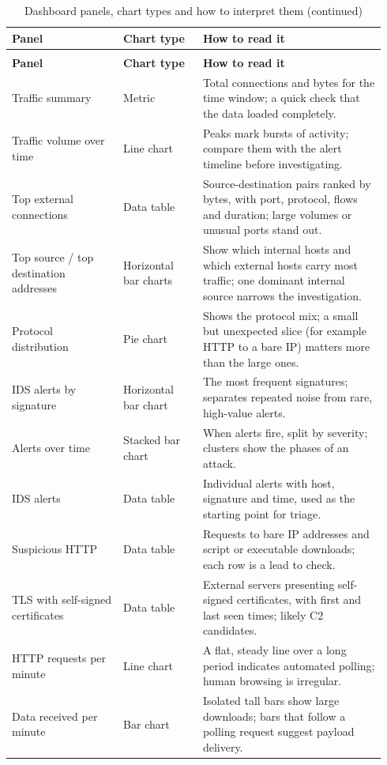 \begin{longtable}{@{}>{\colragged\arraybackslash}p{0.28\linewidth}>{\colragged\arraybackslash}p{0.20\linewidth}>{\colragged\arraybackslash}p{0.46\linewidth}@{}}
  \caption{Dashboard panels, chart types and how to interpret them.}
  \label{tab:dashboard-panels} \\
  \toprule
  \textbf{Panel} & \textbf{Chart type} & \textbf{How to read it} \\
  \midrule
  \endfirsthead
  \caption[]{Dashboard panels, chart types and how to interpret them (continued)} \\
  \toprule
  \textbf{Panel} & \textbf{Chart type} & \textbf{How to read it} \\
  \midrule
  \endhead
  \bottomrule
  \endlastfoot
  Traffic summary & Metric & Total connections and bytes for the time window; a quick check that the data loaded completely. \\
  Traffic volume over time & Line chart & Peaks mark bursts of activity; compare them with the alert timeline before investigating. \\
  Top external connections & Data table & Source-destination pairs ranked by bytes, with port, protocol, flows and duration; large volumes or unusual ports stand out. \\
  Top source / top destination addresses & Horizontal bar charts & Show which internal hosts and which external hosts carry most traffic; one dominant internal source narrows the investigation. \\
  Protocol distribution & Pie chart & Shows the protocol mix; a small but unexpected slice (for example HTTP to a bare IP) matters more than the large ones. \\
  IDS alerts by signature & Horizontal bar chart & The most frequent signatures; separates repeated noise from rare, high-value alerts. \\
  Alerts over time & Stacked bar chart & When alerts fire, split by severity; clusters show the phases of an attack. \\
  IDS alerts & Data table & Individual alerts with host, signature and time, used as the starting point for triage. \\
  Suspicious HTTP & Data table & Requests to bare IP addresses and script or executable downloads; each row is a lead to check. \\
  TLS with self-signed certificates & Data table & External servers presenting self-signed certificates, with first and last seen times; likely C2 candidates. \\
  HTTP requests per minute & Line chart & A flat, steady line over a long period indicates automated polling; human browsing is irregular. \\
  Data received per minute & Bar chart & Isolated tall bars show large downloads; bars that follow a polling request suggest payload delivery. \\
\end{longtable}

